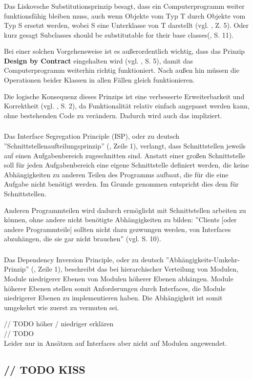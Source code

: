 \subsubsection{\textPrincipleLiskovSubstitution}
\label{\textPrincipleLiskovSubstitution}
Das Liskovsche Substitutionsprinzip besagt, dass ein Computerprogramm weiter funktionsfähig bleiben muss, auch wenn Objekte vom Typ T durch Objekte vom Typ S ersetzt werden, wobei S eine Unterklasse von T darstellt (vgl. \cite{wiki:lsp}, Z. 5). Oder kurz gesagt \glqq Subclasses should be substitutable for their base classes\grqq(\cite{knoernschild2002java}, S. 11).

Bei einer solchen Vorgehensweise ist es außerordentlich wichtig, dass das Prinzip \textbf{Design by Contract} eingehalten wird (vgl. \cite{goll2014architektur}, S. 5), damit das Computerprogramm weiterhin richtig funktioniert. Nach außen hin müssen die Operationen beider Klassen in allen Fällen gleich funktionieren.

Die logische Konsequenz dieses Prinzips ist eine verbesserte Erweiterbarkeit und Korrektheit (vgl. \cite{itDesignersSOLID}, S. 2), da Funktionalität relativ einfach angepasst werden kann, ohne bestehenden Code zu verändern. 
Dadurch wird auch das  impliziert.


\subsubsection{\textPrincipleInterfaceSegregation}
\label{\textPrincipleInterfaceSegregation}
Das Interface Segregation Principle (ISP), oder zu deutsch ''Schnittstellenaufteilungsprinzip'' (\cite{wiki:isp}, Zeile 1), verlangt, dass Schnittstellen jeweils auf einen Aufgabenbereich zugeschnitten sind.
Anstatt einer großen Schnittstelle soll für jeden Aufgabenbereich eine eigene
Schnittstelle definiert werden, die keine Abhängigkeiten zu anderen Teilen des Programms 
aufbaut, die für die eine Aufgabe nicht benötigt werden.
Im Grunde genommen entspricht dies dem   für Schnittstellen.

Anderen Programmteilen wird dadurch ermöglicht mit Schnittstellen arbeiten zu können, ohne andere nicht benötigte Abhängigkeiten zu bilden: ''Clients [oder andere Programmteile] sollten nicht dazu gezwungen werden, von Interfaces abzuhängen, die sie gar nicht brauchen'' (vgl. \cite{goll2014architektur} S. 10).


\subsubsection{\textPrincipleDependencyInversion}
\label{\textPrincipleDependencyInversion}
Das Dependency Inversion Principle, oder zu deutsch ''Abhängigkeits-Umkehr-Prinzip'' (\cite{wiki:dip}, Zeile 1),
beschreibt das bei hierarchischer Verteilung von Modulen, Module niedrigerer Ebenen von Modulen höherer Ebenen abhängen.
Module höherer Ebenen stellen somit Anforderungen durch Interfaces, die Module niedrigerer Ebenen zu implementieren haben.
Die Abhängigkeit ist somit umgekehrt wie zuerst zu vermuten sei.

// TODO höher / niedriger erklären \\
// TODO \\
Leider nur in Ansätzen auf Interfaces aber nicht auf Modulen angewendet.

\subsection{// TODO KISS}
